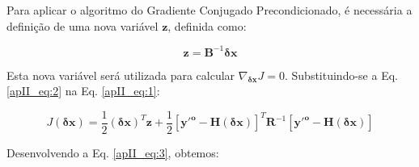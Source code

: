 Para aplicar o algoritmo do Gradiente Conjugado Precondicionado, é necessária a definição de uma nova variável $\mathbf{z}$, definida como:

\begin{equation}
\label{apII_eq:2}
\mathbf{z} = \mathbf{B}^{-1}\mathbf{\delta{x}}
\end{equation}

Esta nova variável será utilizada para calcular $\nabla_{\mathbf{\delta{x}}}J=0$. Substituindo-se a Eq. \ref{apII_eq:2} na Eq. \ref{apII_eq:1}:

\begin{equation}
\label{apII_eq:3}
  J(\mathbf{\delta{x}}) = \frac{1}{2}(\mathbf{\delta{x}})^{T}\mathbf{z} + \frac{1}{2}[\mathbf{y'^o} - \mathbf{H}(\mathbf{\delta{x}})]^{T}\mathbf{R}^{-1}[\mathbf{y'^o} - \mathbf{H}(\mathbf{\delta{x}})]
\end{equation}

Desenvolvendo a Eq. \ref{apII_eq:3}, obtemos:





